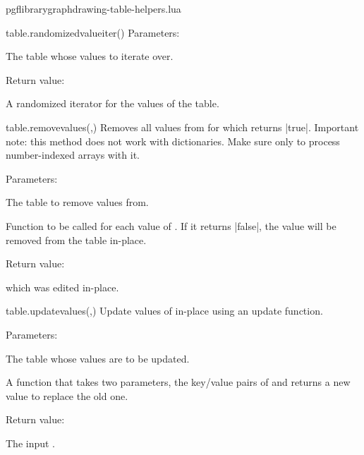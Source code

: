 \begin{filedescription}{pgflibrarygraphdrawing-table-helpers.lua}
\begin{luacommand}{{table.randomized\textunderscore{}value\textunderscore{}iter}()}
Parameters:
\begin{parameterdescription}
	\item[\meta{table}] The table whose values to iterate over. 
\end{parameterdescription}


Return value:
\begin{parameterdescription} 
  \item[] A randomized iterator for the values of the table. 
\end{parameterdescription}


\end{luacommand}
\begin{luacommand}{{table.remove\textunderscore{}values}(,)}
Removes all values from  for which  returns |true|.  Important note: this method does not work with dictionaries. Make sure only to process number-indexed arrays with it. 

Parameters:
\begin{parameterdescription}
	\item[\meta{input}] The table to remove values from.\item[\meta{remove\_func}] Function to be called for each value of . If it returns |false|, the value will be removed from the table in-place. 
\end{parameterdescription}


Return value:
\begin{parameterdescription} 
  \item[]  which was edited in-place. 
\end{parameterdescription}


\end{luacommand}
\begin{luacommand}{{table.update\textunderscore{}values}(,)}
Update values of  in-place using an update function. 

Parameters:
\begin{parameterdescription}
	\item[\meta{table}] The table whose values are to be updated.\item[\meta{update\_func}] A function that takes two parameters, the key/value pairs of  and returns a new value to replace the old one. 
\end{parameterdescription}


Return value:
\begin{parameterdescription} 
  \item[] The input . 
\end{parameterdescription}



\end{luacommand}
\end{filedescription}
